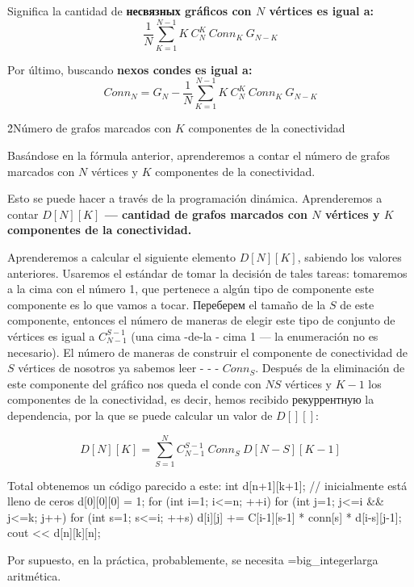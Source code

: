 Significa la cantidad de \bf{несвязных} gráficos con $N$ vértices es igual a:
$$ \frac{1}{N} \sum_{K=1}^{N-1} K\ C_N^K\ Conn_K\ G_{N-K} $$

Por último, buscando \bf{nexos} condes es igual a:
$$ Conn_N = G_N - \frac{1}{N} \sum_{K=1}^{N-1} K\ C_N^K\ Conn_K\ G_{N-K} $$

\h2{Número de grafos marcados con $K$ componentes de la conectividad}

Basándose en la fórmula anterior, aprenderemos a contar el número de grafos marcados con $N$ vértices y $K$ componentes de la conectividad.

Esto se puede hacer a través de la programación dinámica. Aprenderemos a contar \bf{$D[N][K]$} --- cantidad de grafos marcados con $N$ vértices y $K$ componentes de la conectividad.

Aprenderemos a calcular el siguiente elemento $D[N][K]$, sabiendo los valores anteriores. Usaremos el estándar de tomar la decisión de tales tareas: tomaremos a la cima con el número 1, que pertenece a algún tipo de componente este componente es lo que vamos a tocar. Переберем el tamaño de la $S$ de este componente, entonces el número de maneras de elegir este tipo de conjunto de vértices es igual a $C_{N-1}^{S-1}$ (una cima -de-la - cima 1 --- la enumeración no es necesario). El número de maneras de construir el componente de conectividad de $S$ vértices de nosotros ya sabemos leer - - - $Conn_S$. Después de la eliminación de este componente del gráfico nos queda el conde con $N S$ vértices y $K-1$ los componentes de la conectividad, es decir, hemos recibido рекуррентную la dependencia, por la que se puede calcular un valor de $D[][]$:

$$ D[N][K] = \sum_{S=1}^{N} C_{N-1}^{S-1}\ Conn_S\ D[N-S][K-1] $$

Total obtenemos un código parecido a este:
\code
int d[n+1][k+1]; // inicialmente está lleno de ceros
d[0][0][0] = 1;
for (int i=1; i<=n; ++i)
for (int j=1; j<=i && j<=k; j++)
for (int s=1; s<=i; ++s)
d[i][j] += C[i-1][s-1] * conn[s] * d[i-s][j-1];
cout << d[n][k][n];
\endcode

Por supuesto, en la práctica, probablemente, se necesita \algohref=big_integer{larga aritmética}.